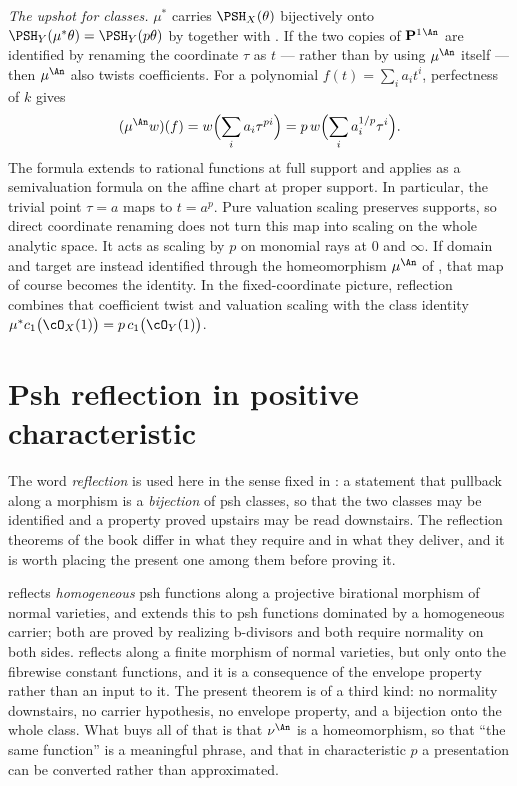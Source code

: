 \begin{example}
\emph{The upshot for classes.}  $\mu^*$ carries
$\PSH_X(\theta)$ bijectively onto $\PSH_Y(\mu^*\theta)=\PSH_Y(p\theta)$
by  together with
.  If the two copies of
$\mathbf P^1{}^{\An}$ are identified by renaming the coordinate $\tau$
as $t$ --- rather than by using $\mu^{\An}$ itself --- then
$\mu^{\An}$ also twists coefficients.  For a polynomial
$f(t)=\sum_i a_it^i$, perfectness of $k$ gives
\[
 (\mu^{\An}w)(f)
 =w\Bigl(\sum_i a_i\tau^{pi}\Bigr)
 =p\,w\Bigl(\sum_i a_i^{1/p}\tau^i\Bigr).
\]
The formula extends to rational functions at full support and applies
as a semivaluation formula on the affine chart at proper support.
In particular, the trivial point $\tau=a$ maps to $t=a^p$.
Pure valuation scaling preserves supports, so direct coordinate renaming
does not turn this map into scaling on the whole analytic space.
It acts as scaling by $p$ on monomial rays at $0$ and $\infty$.  If domain and target are
instead identified through the homeomorphism $\mu^{\An}$ of
, that map of course becomes
the identity.  In the fixed-coordinate picture, reflection combines that coefficient
twist and valuation scaling with the class identity
$\mu^*c_1\bigl(\cO_X(1)\bigr)=p\,c_1\bigl(\cO_Y(1)\bigr)$.
\end{example}

\section{Psh reflection in positive characteristic}
\label{sec:ch43-reflection}

The word \emph{reflection} is used here in the sense fixed in
: a statement that pullback along a morphism is a
\emph{bijection} of psh classes, so that the two classes may be identified
and a property proved upstairs may be read downstairs.  The reflection
theorems of the book differ in what they require and in what they deliver,
and it is worth placing the present one among them before proving it.

 reflects \emph{homogeneous} psh
functions along a projective birational morphism of normal varieties, and
 extends this to psh functions dominated by
a homogeneous carrier; both are proved by realizing b-divisors and both
require normality on both sides.   reflects
along a finite morphism of normal varieties, but only onto the fibrewise
constant functions, and it is a consequence of the envelope property rather
than an input to it.  The present theorem is of a third kind: no
normality downstairs, no carrier hypothesis, no envelope property, and a
bijection onto the whole class.  What buys all of that is that
$\nu^{\An}$ is a homeomorphism, so that ``the same function'' is a
meaningful phrase, and that in characteristic $p$ a presentation can be
converted rather than approximated.

